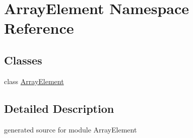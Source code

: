 \hypertarget{namespace_array_element}{}\section{Array\+Element Namespace Reference}
\label{namespace_array_element}
\subsection*{Classes}
\begin{DoxyCompactItemize}
\item 
class \hyperlink{class_array_element_1_1_array_element}{Array\+Element}
\end{DoxyCompactItemize}


\subsection{Detailed Description}
\begin{DoxyVerb}generated source for module ArrayElement \end{DoxyVerb}
 